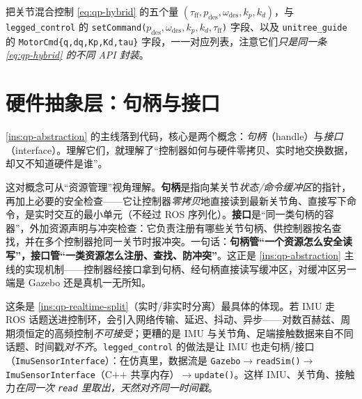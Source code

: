 \begin{practice}
把关节混合控制 \cref{eq:qp-hybrid} 的五个量 $(\tau_{\mathrm{ff}},p_{\mathrm{des}},\omega_{\mathrm{des}},k_p,k_d)$，与 \texttt{legged\_control} 的 \texttt{setCommand($p_{\mathrm{des}},\omega_{\mathrm{des}},k_p,k_d,\tau_{\mathrm{ff}}$)} 字段、以及 \texttt{unitree\_guide} 的 \texttt{MotorCmd\{q,dq,Kp,Kd,tau\}} 字段，一一对应列表，注意它们\emph{只是同一条 \cref{eq:qp-hybrid} 的不同 API 封装}。
\end{practice}

\section{硬件抽象层：句柄与接口}
\label{sec:qp-hwabs}

\cref{ins:qp-abstraction} 的主线落到代码，核心是两个概念：\emph{句柄}（handle）与\emph{接口}（interface）。理解它们，就理解了“控制器如何与硬件零拷贝、实时地交换数据，却又不知道硬件是谁”。

\begin{insight}[句柄 = 指针 + 安全检查；接口 = 句柄容器 + 资源管理]\label{ins:qp-handle-iface}
这对概念可从“资源管理”视角理解。\textbf{句柄}是指向某关节\emph{状态/命令缓冲区}的指针，再加上必要的安全检查——它让控制器\emph{零拷贝}地直接读到最新关节角、直接写下命令，是实时交互的最小单元（不经过 ROS 序列化）。\textbf{接口}是“同一类句柄的容器”，外加资源声明与冲突检查：它负责注册有哪些关节句柄、供控制器按名查找，并在多个控制器抢同一关节时报冲突。一句话：\textbf{句柄管“一个资源怎么安全读写”，接口管“一类资源怎么注册、查找、防冲突”}。这正是 \cref{ins:qp-abstraction} 主线的实现机制——控制器经接口拿到句柄、经句柄直接读写缓冲区，对缓冲区另一端是 Gazebo 还是真机一无所知。
\end{insight}

\begin{insight}\label{ins:qp-imu-no-topic}
这条是 \cref{ins:qp-realtime-split}（实时/非实时分离）最具体的体现。若 IMU 走 ROS 话题送进控制环，会引入网络传输、延迟、抖动、异步——对数百赫兹、周期须恒定的高频控制\emph{不可接受}；更糟的是 IMU 与关节角、足端接触数据来自不同话题、时间戳\emph{对不齐}。\texttt{legged\_control} 的做法是让 IMU 也走句柄/接口（\texttt{ImuSensorInterface}）：在仿真里，数据流是 \texttt{Gazebo}$\to$\texttt{readSim()}$\to$\texttt{ImuSensorInterface}（C++ 共享内存）$\to$\texttt{update()}。这样 IMU、关节角、接触力\emph{在同一次 \texttt{read} 里取出，天然对齐同一时间戳}\cite{sleiman2021unified}。
\end{insight}

